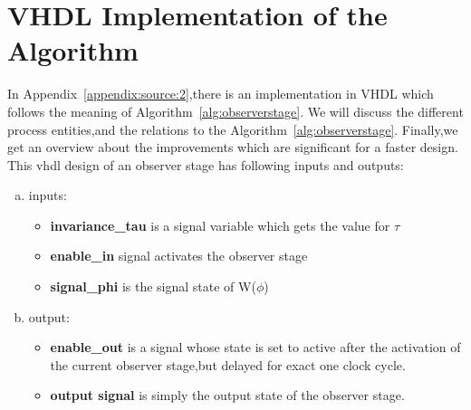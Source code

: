 \section{VHDL Implementation of the Algorithm}  
\label{chapter:sub:2}
In Appendix~\ref{appendix:source:2},there is an implementation in VHDL which follows the meaning of Algorithm~\ref{alg:observerstage}.
We will discuss the different process entities,and the relations to the Algorithm~\ref{alg:observerstage}.
Finally,we get an overview about the improvements which are significant for a faster design. 
This vhdl design of an observer stage has following inputs and outputs:
\begin{enumerate}[(a)]
\item inputs:
\begin{itemize}
\item \textbf{invariance\_tau} is a signal variable which gets the value for $\tau$
\item \textbf{enable\_in} signal activates the observer stage
\item \textbf{signal\_phi} is the signal state of W($\phi$)
\end{itemize}
\newpage
\item output:
\begin{itemize}
\item \textbf{enable\_out} is a signal whose state is set to active after the activation of the current observer stage,but delayed for exact one clock cycle.   
\item \textbf{output signal} is simply the output state of the observer stage.
\end{itemize}
\end{enumerate}

